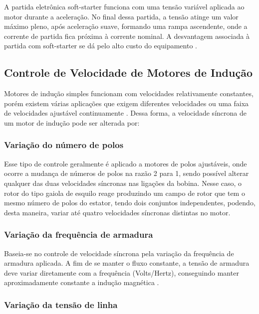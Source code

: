 				A partida eletrônica soft-starter funciona com uma tensão variável aplicada ao motor durante a aceleração. No final dessa partida, a tensão atinge um valor máximo pleno, após aceleração suave, formando uma rampa ascendente, onde a corrente de partida fica próxima à corrente nominal. A desvantagem associada à partida com soft-starter se dá pelo alto custo do equipamento \cite{WEGMotorEletrico}\cite{Fitzgerald}.


		\subsection{Controle de Velocidade de Motores de Indução}

			Motores de indução simples funcionam com velocidades relativamente constantes, porém existem várias aplicações que exigem diferentes velocidades ou uma faixa de velocidades ajustável continuamente \cite{WEGMotorEletrico}\cite{Fitzgerald}. Dessa forma, a velocidade síncrona de um motor de indução pode ser alterada por:

			\subsubsection{Variação do número de polos}

				Esse tipo de controle geralmente é aplicado a motores de polos ajustáveis, onde ocorre a mudança de números de polos na razão 2 para 1, sendo possível alterar qualquer das duas velocidades síncronas nas ligações da bobina. Nesse caso, o rotor do tipo gaiola de esquilo reage produzindo um campo de rotor que tem o mesmo número de polos do estator, tendo dois conjuntos independentes, podendo, desta maneira, variar até quatro velocidades síncronas distintas no motor\cite{WEGMotorEletrico}\cite{Fitzgerald}.

			\subsubsection{Variação da frequência de armadura}

				Baseia-se no controle de velocidade síncrona pela variação da frequência de armadura aplicada. A fim de se manter o fluxo constante, a tensão de armadura deve variar diretamente com a frequência (Volts/Hertz), conseguindo manter aproximadamente constante a indução magnética \cite{WEGMotorEletrico}\cite{Fitzgerald}.

			\subsubsection{Variação da tensão de linha}


